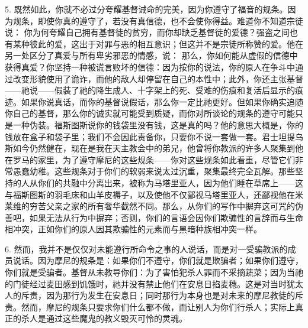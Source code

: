 5. 既然如此，你就不必过分夸耀基督诫命的完美，因为你遵守了福音的规条。因为规条，即使你真的遵守了，若没有真信德，也不会使你得益。难道你不知道宗徒说： 你为何夸耀自己拥有基督徒的贫穷，而你却缺乏基督徒的爱德？强盗之间也有某种彼此的爱，这出于对罪与恶的相互意识；但这并不是宗徒所称赞的爱。他在另一处区分了真爱与所有卑劣邪恶的情感，说： 那么，你如何能从虚假的信德中获得真爱？你坚持一种被谎言败坏的信德：因为按你的说法，你的原人在争斗中通过改变形貌使用了诡诈，而他的敌人却停留在自己的本性中；此外，你还主张基督——祂说——假装了祂的降生成人、十字架上的死、受难的伤痕和复活后显示的痕迹。如果你说真话，而你的基督说假话，那么你一定比祂更好。但如果你确实追随你自己的基督，那么你的诚实就可能受到质疑，而你对所谈论的规条的遵守可能只是一种伪装。福斯图斯说你的钱袋里没有钱，这是真的吗？他的意思大概是，你的钱放在盒子和袋子里；我们不会因此责备你，只要你不说一套做一套。君士坦提乌斯如今仍然健在，现在是我在天主教会中的弟兄，他曾将你教派的许多人聚集到他在罗马的家里，为了遵守摩尼的这些规条——你对这些规条如此看重，尽管它们非常愚蠢幼稚。这些规条对于你们的软弱来说太过沉重，聚集最终完全瓦解。那些坚持的人从你们的共融中分离出来，被称为马塔里亚人，因为他们睡在草席上——这与福斯图斯的羽毛床和山羊皮褥子，以及使他不仅鄙视马塔里亚人，还鄙视他在米莱维的穷苦父亲之家的所有奢华截然不同。那么，从你们的写作中摒弃这可咒的伪善吧，如果无法从行为中摒弃；否则，你们的言语会因你们欺骗性的言辞而与生命相冲突，正如你们的原人因其欺骗性的元素而与黑暗种族相冲突一样。\par

6. 然而，我并不是仅仅对未能遵行所命令之事的人说话，而是对一受骗教派的成员说话。因为摩尼的规条是：如果你们不遵守，你们就是欺骗者；如果你们遵守，你们就是受骗者。基督从未教导你们：为了害怕犯杀人罪而不采摘蔬菜；因为当祂的门徒经过麦田感到饥饿时，祂并没有禁止他们在安息日掐麦穗。这是对当时犹太人的斥责，因为那行为发生在安息日；同时那行为本身也是对未来的摩尼教徒的斥责。然而，摩尼的规条只要求你们什么都不做，而让别人为你们行杀人；实际上真正的杀人是通过这些魔鬼的教义毁灭可怜的灵魂。\par

